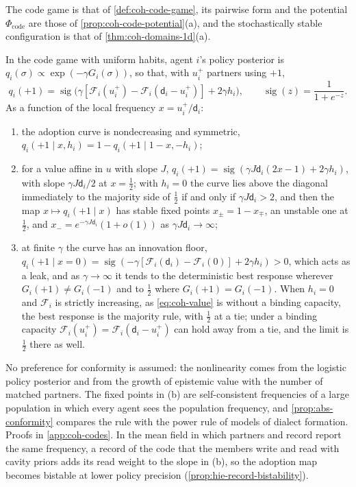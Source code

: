 The code game is that of \cref{def:coh-code-game}, its pairwise form and the potential $\Phi_{\mathrm{code}}$ are those of \cref{prop:coh-code-potential}(a), and the stochastically stable configuration is that of \cref{thm:coh-domains-1d}(a).

\begin{proposition}\label{prop:coh-adoption}
In the code game with uniform habits, agent $i$'s policy posterior is $q_i(\sigma)\propto\exp(-\gamma G_i(\sigma))$, so that, with $u^+_i$ partners using $+1$,
\[ q_i(+1)=\operatorname{sig}\bigl(\gamma[\mathcal F_i(u^+_i)-\mathcal F_i(\mathsf d_i-u^+_i)]+2\gamma h_i\bigr),\qquad\operatorname{sig}(z)=\frac{1}{1+e^{-z}}. \]
As a function of the local frequency $x=u^+_i/\mathsf d_i$:
\begin{enumerate}\renewcommand{\labelenumi}{(\alph{enumi})}
\item the adoption curve is nondecreasing and symmetric, $q_i(+1\mid x,h_i)=1-q_i(+1\mid1-x,-h_i)$;
\item for a value affine in $u$ with slope $J$, $q_i(+1)=\operatorname{sig}(\gamma J\mathsf d_i(2x-1)+2\gamma h_i)$, with slope $\gamma J\mathsf d_i/2$ at $x=\frac12$; with $h_i=0$ the curve lies above the diagonal immediately to the majority side of $\frac12$ if and only if $\gamma J\mathsf d_i>2$, and then the map $x\mapsto q_i(+1\mid x)$ has stable fixed points $x_\pm=1-x_\mp$, an unstable one at $\frac12$, and $x_-=e^{-\gamma J\mathsf d_i}(1+o(1))$ as $\gamma J\mathsf d_i\to\infty$;
\item at finite $\gamma$ the curve has an innovation floor, $q_i(+1\mid x=0)=\operatorname{sig}(-\gamma[\mathcal F_i(\mathsf d_i)-\mathcal F_i(0)]+2\gamma h_i)>0$, which acts as a leak, and as $\gamma\to\infty$ it tends to the deterministic best response wherever $G_i(+1)\ne G_i(-1)$ and to $\frac12$ where $G_i(+1)=G_i(-1)$. When $h_i=0$ and $\mathcal F_i$ is strictly increasing, as \eqref{eq:coh-value} is without a binding capacity, the best response is the majority rule, with $\frac12$ at a tie; under a binding capacity $\mathcal F_i(u^+_i)=\mathcal F_i(\mathsf d_i-u^+_i)$ can hold away from a tie, and the limit is $\frac12$ there as well.
\end{enumerate}
\end{proposition}

No preference for conformity is assumed: the nonlinearity comes from the logistic policy posterior and from the growth of epistemic value with the number of matched partners. The fixed points in (b) are self-consistent frequencies of a large population in which every agent sees the population frequency, and \cref{prop:abs-conformity} compares the rule with the power rule of models of dialect formation. Proofs in \cref{app:coh-codes}. In the mean field in which partners and record report the same frequency, a record of the code that the members write and read with cavity priors adds its read weight to the slope in (b), so the adoption map becomes bistable at lower policy precision (\cref{prop:hie-record-bistability}).

